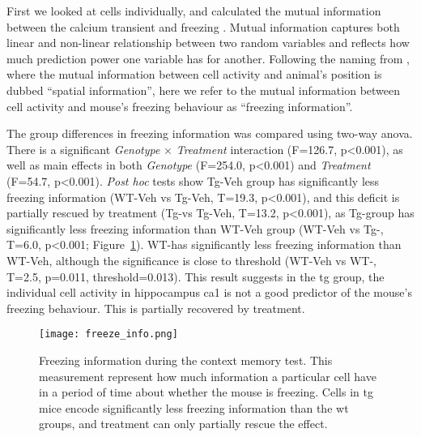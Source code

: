First we looked at cells individually, and calculated the mutual information between the calcium transient and freezing \citep{ross14, victor02}. Mutual information captures both linear and non-linear relationship between two random variables and reflects how much prediction power one variable has for another. Following the naming from \citet{skaggs93}, where the mutual information between cell activity and animal's position is dubbed ``spatial information'', here we refer to the mutual information between cell activity and mouse's freezing behaviour as ``freezing information''. 

The group differences in freezing information was compared using two-way \gls{anova}. There is a significant \textit{Genotype} $\times$ \textit{Treatment} interaction (F=126.7, p<0.001), as well as main effects in both \textit{Genotype} (F=254.0, p<0.001) and \textit{Treatment} (F=54.7, p<0.001). \textit{Post hoc} tests show Tg-Veh group has significantly less freezing information (WT-Veh vs Tg-Veh, T=19.3, p<0.001), and this deficit is partially rescued by \tglu treatment (Tg-\glu vs Tg-Veh, T=13.2, p<0.001), as Tg-\glu group has significantly less freezing information than WT-Veh group (WT-Veh vs Tg-\glu, T=6.0, p<0.001; Figure~\ref{f.ad.freeze_info}). WT-\glu has significantly less freezing information than WT-Veh, although the significance is close to threshold (WT-Veh vs WT-\glu, T=2.5, p=0.011, threshold=0.013). This result suggests in the \gls{tg} group, the individual cell activity in hippocampus \gls{ca1} is not a good predictor of the mouse's freezing behaviour. This is partially recovered by \tglu treatment. 
\begin{figure}[h]
    \texttt{[image: freeze\_info.png]}
    \caption{Freezing information during the context memory test. This measurement represent how much information a particular cell have in a period of time about whether the mouse is freezing. Cells in \gls{tg} mice encode significantly less freezing information than the \gls{wt} groups, and \tglu treatment can only partially rescue the effect. \label{f.ad.freeze_info}}
\end{figure}
    



